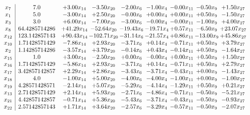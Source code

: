 \documentclass[8pt]{article}
\begin{document}
\[\begin{array}{c| c c@{\hskip 2pt} c@{\hskip 2pt} c@{\hskip 2pt} c@{\hskip 2pt} c@{\hskip 2pt} c@{\hskip 2pt} c@{\hskip 2pt} }
 x_{7}   &  7.0 & +  3.00 x_{14} & -3.50 x_{20} & -2.00 x_{6} & -1.00 x_{4} & -0.00 x_{11} & -0.50 x_{9} & +  1.50 x_{27}\\
 x_{1}   &  5.0 & -3.00 x_{14} & +  2.50 x_{20} & -0.00 x_{6} & +  0.00 x_{4} & +  0.00 x_{11} & +  0.50 x_{9} & -1.50 x_{27}\\
 x_{3}   &  3.0 & +  6.00 x_{14} & -7.00 x_{20} & -3.00 x_{6} & -0.00 x_{4} & -0.00 x_{11} & -1.00 x_{9} & +  4.00 x_{27}\\
 x_{8}   &  64.4285714286 & + 41.29 x_{14} & -52.64 x_{20} & -19.43 x_{6} & -19.71 x_{4} & +  0.57 x_{11} & -6.50 x_{9} & + 23.07 x_{27}\\
 x_{12}   &  123.142857143 & + 90.43 x_{14} & -102.71 x_{20} & -31.14 x_{6} & -21.57 x_{4} & +  0.86 x_{11} & -13.00 x_{9} & + 45.86 x_{27}\\
 x_{10}   &  1.71428571429 & -7.86 x_{14} & +  2.93 x_{20} & -3.71 x_{6} & +  0.14 x_{4} & -0.71 x_{11} & +  0.50 x_{9} & +  3.79 x_{27}\\
 x_{2}   &  1.14285714286 & -3.57 x_{14} & +  3.79 x_{20} & -0.14 x_{6} & +  0.43 x_{4} & -0.14 x_{11} & +  0.50 x_{9} & -1.64 x_{27}\\
 x_{15}   &  1.0 & +  3.00 x_{14} & -2.50 x_{20} & +  0.00 x_{6} & -0.00 x_{4} & +  0.00 x_{11} & +  0.50 x_{9} & +  1.50 x_{27}\\
 x_{16}   &  1.71428571429 & -5.86 x_{14} & +  2.93 x_{20} & -3.71 x_{6} & +  0.14 x_{4} & -0.71 x_{11} & +  0.50 x_{9} & +  2.79 x_{27}\\
 x_{17}   &  3.42857142857 & +  2.29 x_{14} & +  2.86 x_{20} & -3.43 x_{6} & -3.71 x_{4} & -0.43 x_{11} & +  0.00 x_{9} & -1.43 x_{27}\\
 x_{18}   &  4.0 & -1.00 x_{14} & +  5.00 x_{20} & -4.00 x_{6} & -4.00 x_{4} & -1.00 x_{11} & +  0.00 x_{9} & -1.00 x_{27}\\
 x_{19}   &  4.28571428571 & -2.14 x_{14} & +  5.07 x_{20} & -5.29 x_{6} & -4.14 x_{4} & -1.29 x_{11} & +  0.50 x_{9} & +  0.21 x_{27}\\
 x_{13}   &  2.71428571429 & +  2.14 x_{14} & +  5.93 x_{20} & -2.71 x_{6} & -4.86 x_{4} & -0.71 x_{11} & -0.50 x_{9} & -5.21 x_{27}\\
 x_{21}   &  4.42857142857 & -0.71 x_{14} & +  5.36 x_{20} & -5.43 x_{6} & -3.71 x_{4} & -0.43 x_{11} & -0.50 x_{9} & -0.93 x_{27}\\
 x_{22}   &  2.57142857143 & +  1.71 x_{14} & +  3.64 x_{20} & -2.57 x_{6} & -3.29 x_{4} & -0.57 x_{11} & -0.50 x_{9} & -2.07 x_{27}\\

\end{array}\]
\end{document}
